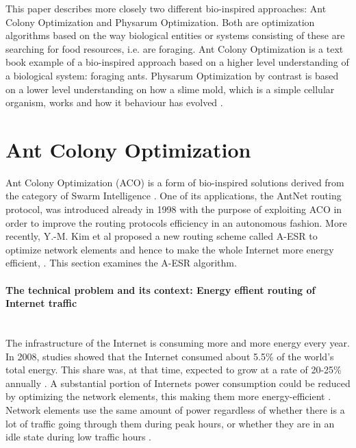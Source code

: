 \documentclass[cameraready]{IWORK2014}
\begin{document}
This paper describes more closely two different bio-inspired approaches: Ant Colony Optimization and Physarum Optimization. Both are optimization algorithms based on the way biological entities or systems consisting of these are searching for food resources, i.e. are foraging. Ant Colony Optimization is a text book example of a bio-inspired approach based on a higher level understanding of a biological system: foraging ants. Physarum Optimization by contrast is based on a lower level understanding on how a slime mold, which is a simple cellular organism, works and how it behaviour has evolved \cite{liu2012physarum}.

\section{Ant Colony Optimization}
Ant Colony Optimization (ACO) is a form of bio-inspired solutions derived from the category of Swarm Intelligence \cite{hylsberg2011bioinspired}. One of its applications, the AntNet routing protocol, was introduced already in 1998 \cite{di1998antnet} with the purpose of exploiting ACO in order to improve the routing protocols efficiency in an autonomous fashion. More recently, Y.-M. Kim et al \cite{kim2012ant} proposed a new routing scheme called A-ESR to optimize network elements and hence to make the whole Internet more energy efficient, \cite{kim2011ant}. This section examines the A-ESR algorithm.

\paragraph{The technical problem and its context: Energy effient routing of Internet traffic}~\\
The infrastructure of the Internet is consuming more and more energy every year. In 2008, studies showed that the Internet consumed about 5.5\% of the world's total energy. This share was, at that time, expected to grow at a rate of 20-25\% annually \cite{proceedings2008energy}. A substantial portion of Internets power consumption could be reduced by optimizing the network elements, this making them more energy-efficient \cite{andrews2010routing}. Network elements use the same amount of power regardless of whether there is a lot of traffic going through them during peak hours, or whether they are in an idle state during low traffic hours \cite{gupta2007using}.
\end{document}
